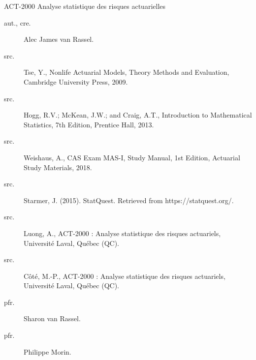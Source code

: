 \begin{contrib}{ACT-2000\: Analyse statistique des risques actuarielles}
\begin{description}
	\item[aut., cre.] Alec James van Rassel.
	\item[src.]	Tse, Y., Nonlife Actuarial Models, Theory Methods and Evaluation, Cambridge University Press, 2009.
	\item[src.]	Hogg, R.V.; McKean, J.W.; and Craig, A.T., Introduction to Mathematical Statistics, 7th Edition, Prentice Hall, 2013.
	\item[src.]	Weishaus, A., CAS Exam MAS-I, Study Manual, 1st Edition, Actuarial Study Materials, 2018.
	\item[src.]	Starmer, J. (2015). StatQuest. Retrieved from https://statquest.org/.
	\item[src.]	Luong, A., ACT-2000 : Analyse statistique des risques actuariels, Université Laval, Québec (QC).
	\item[src.]	Côté, M.-P., ACT-2000 : Analyse statistique des risques actuariels, Université Laval, Québec (QC).
	\item[pfr.]	Sharon van Rassel.
	\item[pfr.]	Philippe Morin.
\end{description}
\end{contrib}
